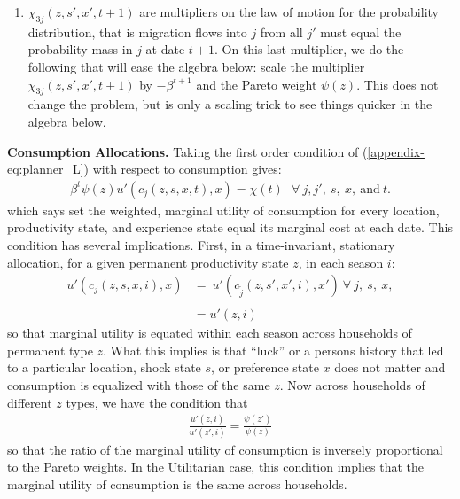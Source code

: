 \documentclass[12pt,pdftex]{article}
\begin{document}
\begin{onehalfspacing}
\begin{enumerate}
\item $\chi_{3j}(z, s', x', t+1)$ are multipliers on the law of motion for the probability distribution, that is migration flows into $j$ from all $j'$ must equal the probability mass in $j$ at date $t+1$. On this last multiplier, we do the following that will ease the algebra below: scale the multiplier $\chi_{3j}(z, s', x', t+1)$ by $-\beta^{t+1}$ and the Pareto weight $\psi(z)$. This does not change the problem, but is only a scaling trick to see things quicker in the algebra below.
\end{enumerate}
\textbf{Consumption Allocations.} Taking the first order condition of (\ref{appendix-eq:planner_L}) with respect to consumption gives:
\begin{align}
\beta^{t} \psi(z) u'(c_{j}(z, s, x, t), x) = \chi(t) \ \ \ \forall \ j, j', \ s, \ x, \ \mbox{and} \ t.
\label{appendix-eq:foc_planner}
\end{align}
which says set the weighted, marginal utility of consumption for every location, productivity state, and experience state equal its marginal cost at each date. This condition has several implications. First, in a time-invariant, stationary allocation, for a given permanent productivity state $z$, in each season $i$:
\begin{align}
u'(c_{j}(z, s, x, i), x) & = \ u'(c_{\tilde{j}}(z, s', x', i), x')  \ \forall \ j, \ s, \ x, \label{appendix-eq:foc_planner2} \\
\nonumber \\
& = u'(z,i) \nonumber
\end{align}
so that marginal utility is equated within each season across households of permanent type $z$. What this implies is that ``luck'' or a persons history that led to a particular location, shock state $s$, or preference state $x$ does not matter and consumption is equalized with those of the same $z$. Now across households of different $z$ types, we have the condition that
\begin{align}
\frac{u'(z,i)}{u'(z',i)} = \frac{\psi(z')}{\psi(z)}
\end{align}
so that the ratio of the marginal utility of consumption is inversely proportional to the Pareto weights. In the Utilitarian case, this condition implies that the marginal utility of consumption is the same across households.


\end{onehalfspacing}
\end{document}
